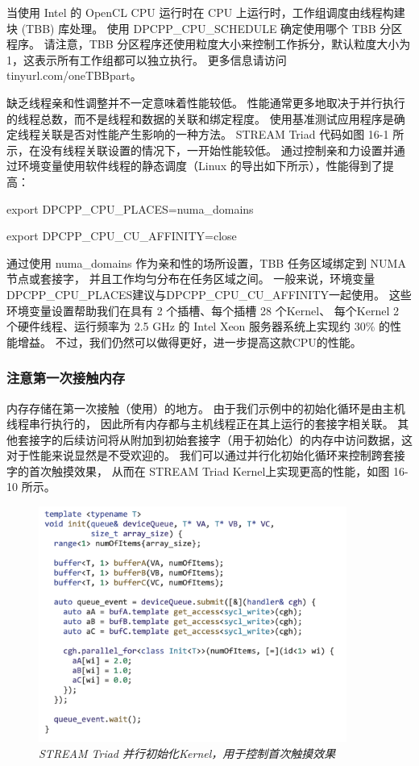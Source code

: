 当使用 Intel 的 OpenCL CPU 运行时在 CPU 上运行时，工作组调度由线程构建块 (TBB) 库处理。 
使用 DPCPP\_CPU\_SCHEDULE 确定使用哪个 TBB 分区程序。 
请注意，TBB 分区程序还使用粒度大小来控制工作拆分，默认粒度大小为 1，这表示所有工作组都可以独立执行。 
更多信息请访问tinyurl.com/oneTBBpart。

缺乏线程亲和性调整并不一定意味着性能较低。 
性能通常更多地取决于并行执行的线程总数，而不是线程和数据的关联和绑定程度。 
使用基准测试应用程序是确定线程关联是否对性能产生影响的一种方法。 
STREAM Triad 代码如图 16-1 所示，在没有线程关联设置的情况下，一开始性能较低。 
通过控制亲和力设置并通过环境变量使用软件线程的静态调度（Linux 的导出如下所示），性能得到了提高：

export DPCPP\_CPU\_PLACES=numa\_domains 

export DPCPP\_CPU\_CU\_AFFINITY=close

通过使用 numa\_domains 作为亲和性的场所设置，TBB 任务区域绑定到 NUMA 节点或套接字，
并且工作均匀分布在任务区域之间。 
一般来说，环境变量DPCPP\_CPU\_PLACES建议与DPCPP\_CPU\_CU\_AFFINITY一起使用。 
这些环境变量设置帮助我们在具有 2 个插槽、每个插槽 28 个Kernel、
每个Kernel 2 个硬件线程、运行频率为 2.5 GHz 的 Intel Xeon 服务器系统上实现约 30\% 的性能增益。 
不过，我们仍然可以做得更好，进一步提高这款CPU的性能。

\subsubsection{注意第一次接触内存}
内存存储在第一次接触（使用）的地方。 由于我们示例中的初始化循环是由主机线程串行执行的，
因此所有内存都与主机线程正在其上运行的套接字相关联。 
其他套接字的后续访问将从附加到初始套接字（用于初始化）的内存中访问数据，这对于性能来说显然是不受欢迎的。 
我们可以通过并行化初始化循环来控制跨套接字的首次触摸效果，
从而在 STREAM Triad Kernel上实现更高的性能，如图 16-10 所示。

\begin{figure}[H]
	\centering
	\includegraphics[width=0.9\textwidth]{figs/F16.10.png}
	\caption{\textit{STREAM Triad 并行初始化Kernel，用于控制首次触摸效果 }}
\end{figure}


